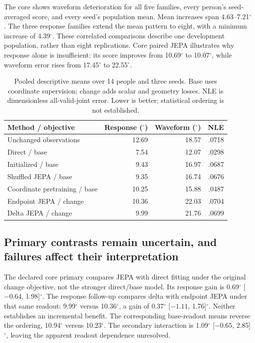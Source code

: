 \documentclass{article}
\newcommand{\degunit}{^{\circ}}
\begin{document}
The core shows waveform deterioration for all five families, every person's seed-averaged score, and every seed's population mean. Mean increases span 4.63--7.21$\degunit$. The three response families extend the mean pattern to eight, with a minimum increase of 4.39$\degunit$. These correlated comparisons describe one development population, rather than eight replications. Core paired JEPA illustrates why response alone is insufficient: its score improves from 10.69$\degunit$ to 10.07$\degunit$, while waveform error rises from 17.45$\degunit$ to 22.55$\degunit$.

\begin{table}[!ht]\centering\small
\caption{Pooled descriptive means over 14 people and three seeds. Base uses coordinate supervision; change adds scalar and geometry losses. NLE is dimensionless all-valid-joint error. Lower is better; statistical ordering is not established.}
\label{tab:results}
\begin{tabular}{lrrr}\toprule
Method / objective & Response ($\degunit$)& Waveform ($\degunit$)& NLE\\\midrule
Unchanged observations &12.69&18.57&.0718\\
Direct / base &7.54&12.07&.0298\\
Initialized / base &9.43&16.97&.0687\\
Shuffled JEPA / base &9.35&16.74&.0676\\
Coordinate pretraining / base &10.25&15.88&.0487\\
Endpoint JEPA / change &10.36&22.03&.0704\\
Delta JEPA / change &9.99&21.76&.0699\\\bottomrule
\end{tabular}\end{table}

\clearpage
\subsection{Primary contrasts remain uncertain, and failures affect their interpretation}
The declared core primary compares JEPA with direct fitting under the original change objective, not the stronger direct/base model. Its response gain is 0.69$\degunit$ [${-0.64}$, 1.98]$\degunit$. The response follow-up compares delta with endpoint JEPA under that same readout: 9.99$\degunit$ versus 10.36$\degunit$, a gain of 0.37$\degunit$ [${-1.11}$, 1.76]$\degunit$. Neither establishes an incremental benefit. The corresponding base-readout means reverse the ordering, 10.94$\degunit$ versus 10.23$\degunit$. The secondary interaction is 1.09$\degunit$ [${-0.65}$, 2.85]$\degunit$, leaving the apparent readout dependence unresolved.
\end{document}
